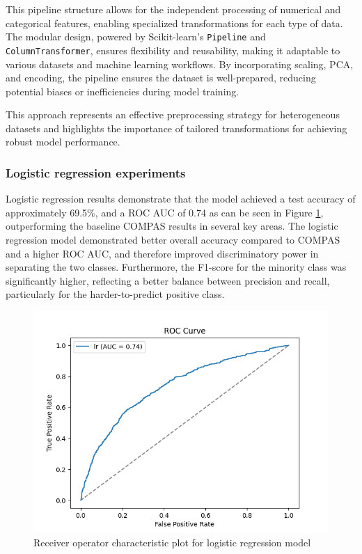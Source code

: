 This pipeline structure allows for the independent processing of numerical and categorical features, enabling specialized transformations for each type of data. The modular design, powered by Scikit-learn’s \texttt{Pipeline} and \texttt{ColumnTransformer}, ensures flexibility and reusability, making it adaptable to various datasets and machine learning workflows. By incorporating scaling, PCA, and encoding, the pipeline ensures the dataset is well-prepared, reducing potential biases or inefficiencies during model training.

This approach represents an effective preprocessing strategy for heterogeneous datasets and highlights the importance of tailored transformations for achieving robust model performance.



\bigskip
\subsubsection{Logistic regression experiments}

Logistic regression results demonstrate that the model achieved a test accuracy of approximately 69.5\%, and a ROC AUC of 0.74 as can be seen in Figure \ref{fig:logisticregressionroc}, outperforming the baseline COMPAS results in several key areas. The logistic regression model demonstrated better overall accuracy compared to COMPAS and a higher ROC AUC, and therefore improved discriminatory power in separating the two classes. Furthermore, the F1-score for the minority class was significantly higher, reflecting a better balance between precision and recall, particularly for the harder-to-predict positive class.

\begin{figure}[H]
	\centering
	\includegraphics[width=0.7\linewidth]{img/logistic_regression_roc}
	\caption{Receiver operator characteristic plot for logistic regression model}
	\label{fig:logisticregressionroc}
\end{figure}


